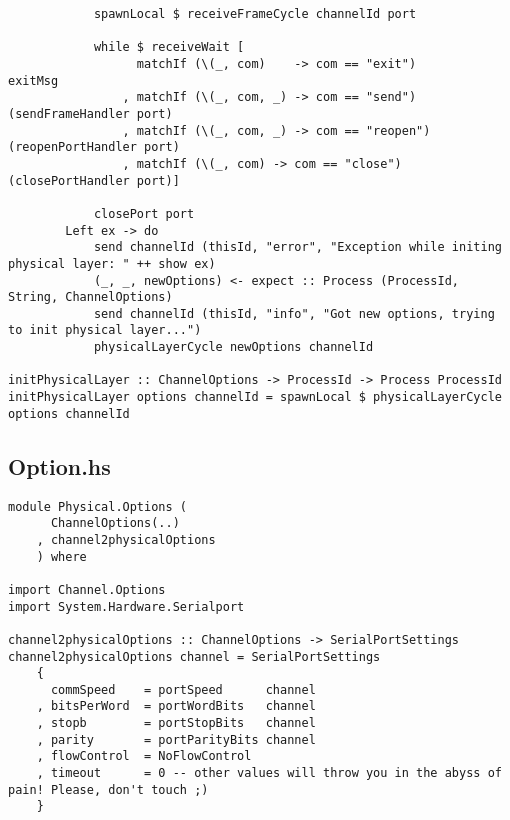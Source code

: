 \documentclass[russian,utf8,simple,emptystyle]{eskdtext}
\begin{document}
\begin{lstlisting}
            spawnLocal $ receiveFrameCycle channelId port

            while $ receiveWait [
                  matchIf (\(_, com)    -> com == "exit")       exitMsg
                , matchIf (\(_, com, _) -> com == "send")       (sendFrameHandler port)
                , matchIf (\(_, com, _) -> com == "reopen")     (reopenPortHandler port)
                , matchIf (\(_, com) -> com == "close")         (closePortHandler port)]

            closePort port
        Left ex -> do
            send channelId (thisId, "error", "Exception while initing physical layer: " ++ show ex)
            (_, _, newOptions) <- expect :: Process (ProcessId, String, ChannelOptions)
            send channelId (thisId, "info", "Got new options, trying to init physical layer...")
            physicalLayerCycle newOptions channelId

initPhysicalLayer :: ChannelOptions -> ProcessId -> Process ProcessId
initPhysicalLayer options channelId = spawnLocal $ physicalLayerCycle options channelId
\end{lstlisting}

\subsection{Option.hs}
\begin{lstlisting}
module Physical.Options (
      ChannelOptions(..)
    , channel2physicalOptions
    ) where 

import Channel.Options
import System.Hardware.Serialport

channel2physicalOptions :: ChannelOptions -> SerialPortSettings
channel2physicalOptions channel = SerialPortSettings
    {
      commSpeed    = portSpeed      channel
    , bitsPerWord  = portWordBits   channel 
    , stopb        = portStopBits   channel 
    , parity       = portParityBits channel
    , flowControl  = NoFlowControl
    , timeout      = 0 -- other values will throw you in the abyss of pain! Please, don't touch ;)
    }
\end{lstlisting}
\end{document}
